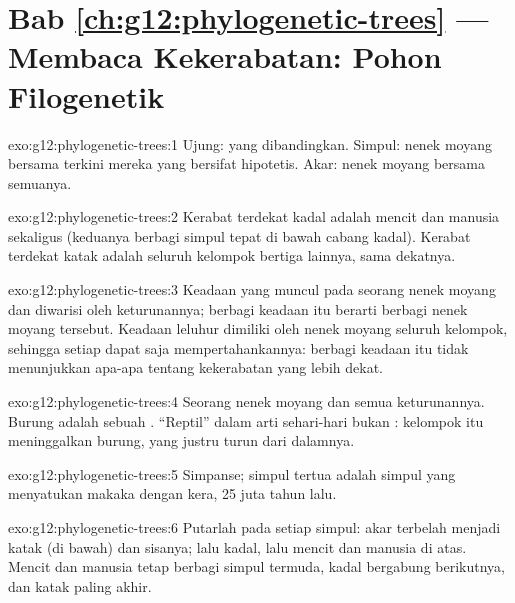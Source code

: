 \section*{Bab \ref{ch:g12:phylogenetic-trees} --- Membaca Kekerabatan: Pohon Filogenetik}

\begin{solution}{exo:g12:phylogenetic-trees:1}
Ujung:  yang dibandingkan. Simpul: nenek moyang bersama terkini
mereka yang bersifat hipotetis. Akar: nenek moyang bersama semuanya.
\end{solution}

\begin{solution}{exo:g12:phylogenetic-trees:2}
Kerabat terdekat kadal adalah mencit dan manusia sekaligus (keduanya
berbagi simpul tepat di bawah cabang kadal). Kerabat terdekat katak
adalah seluruh kelompok bertiga lainnya, sama dekatnya.
\end{solution}

\begin{solution}{exo:g12:phylogenetic-trees:3}
Keadaan yang muncul pada seorang nenek moyang dan diwarisi oleh
keturunannya; berbagi keadaan itu berarti berbagi nenek moyang
tersebut. Keadaan leluhur dimiliki oleh nenek moyang seluruh kelompok,
sehingga setiap  dapat saja mempertahankannya: berbagi keadaan
itu tidak menunjukkan apa-apa tentang kekerabatan yang lebih dekat.
\end{solution}

\begin{solution}{exo:g12:phylogenetic-trees:4}
Seorang nenek moyang dan semua keturunannya. Burung adalah sebuah
. ``Reptil'' dalam arti sehari-hari bukan : kelompok itu
meninggalkan burung, yang justru turun dari dalamnya.
\end{solution}

\begin{solution}{exo:g12:phylogenetic-trees:5}
Simpanse; simpul tertua adalah simpul yang menyatukan makaka dengan
kera, 25 juta tahun lalu.
\end{solution}

\begin{solution}{exo:g12:phylogenetic-trees:6}
Putarlah pada setiap simpul: akar terbelah menjadi katak (di bawah)
dan sisanya; lalu kadal, lalu mencit dan manusia di atas. Mencit dan
manusia tetap berbagi simpul termuda, kadal bergabung berikutnya, dan
katak paling akhir.
\end{solution}

